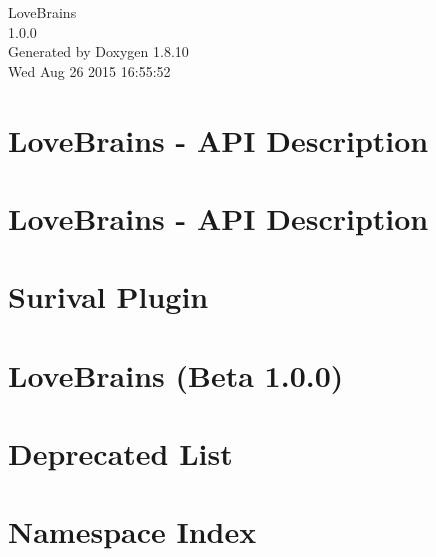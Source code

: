 \documentclass[twoside]{book}
\newcommand{\+}{\discretionary{\mbox{\scriptsize$\hookleftarrow$}}{}{}}
\newcommand{\clearemptydoublepage}{%
  \newpage{\pagestyle{empty}\cleardoublepage}%
}
\begin{document}
\begin{titlepage}
\vspace*{7cm}
\begin{center}%
{\Large Love\+Brains \\[1ex]\large 1.\+0.\+0 }\\
\vspace*{1cm}
{\large Generated by Doxygen 1.8.10}\\
\vspace*{0.5cm}
{\small Wed Aug 26 2015 16:55:52}\\
\end{center}
\end{titlepage}
\clearemptydoublepage
\tableofcontents
\clearemptydoublepage
{}

\chapter{Love\+Brains -\/ A\+P\+I Description}
\label{md__home_robin_f__programming__git__c_p_p__love_brains_api__r_e_a_d_m_e}

\chapter{Love\+Brains -\/ A\+P\+I Description}
\label{md__home_robin_f__programming__git__c_p_p__love_brains_mods_basic_survival_api__r_e_a_d_m_e}

\chapter{Surival Plugin}
\label{md__home_robin_f__programming__git__c_p_p__love_brains_mods_basic_survival__r_e_a_d_m_e}

\chapter{Love\+Brains (Beta 1.0.0)}
\label{md__home_robin_f__programming__git__c_p_p__love_brains__r_e_a_d_m_e}

\chapter{Deprecated List}
\label{deprecated}

\chapter{Namespace Index}

\end{document}
